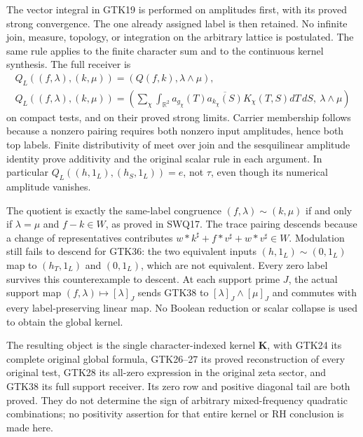 The vector integral in GTK19 is performed on
amplitudes first, with its proved strong
convergence. The one already assigned label
is then retained. No infinite join, measure,
topology, or integration on the arbitrary
lattice is postulated. The same rule applies
to the finite character sum and to the
continuous kernel synthesis. The full receiver is
\begin{equation}\tag{GTK38}
 \begin{gathered}
 Q_L((f,\lambda),(k,\mu))
           =(Q(f,k),\lambda\wedge\mu),\\
 Q_L((f,\lambda),(k,\mu))
 =\left(\sum_\chi\int_{\mathbb R^2}
 a_{g_\chi}(T)\overline{a_{k_\chi}(S)}
                  K_\chi(T,S)dT\,dS,\ \lambda\wedge\mu\right)
 \end{gathered}
\end{equation}
on compact tests, and on their proved strong limits.
Carrier membership follows because a nonzero
pairing requires both nonzero input amplitudes,
hence both top labels. Finite distributivity of
meet over join and the sesquilinear amplitude
identity prove additivity and the original
scalar rule in each argument. In particular
$Q_L((h,1_L),(h_S,1_L))=e$, not $\tau$,
even though its numerical amplitude vanishes.

The quotient is exactly the same-label
congruence $(f,\lambda)\sim(k,\mu)$ if and only
if $\lambda=\mu$ and $f-k\in W$, as proved in
SWQ17. The trace pairing descends because a
change of representatives contributes
$w*k^\sharp+f*v^\sharp+w*v^\sharp\in W$.
Modulation still fails to descend for GTK36:
the two equivalent inputs $(h,1_L)\sim(0,1_L)$
map to $(h_T,1_L)$ and $(0,1_L)$, which are
not equivalent. Every zero label survives
this counterexample to descent. At each
support prime $J$, the actual support map
$(f,\lambda)\mapsto[\lambda]_J$ sends GTK38
to $[\lambda]_J\wedge[\mu]_J$ and commutes
with every label-preserving linear map.
No Boolean reduction or scalar collapse
is used to obtain the global kernel.

The resulting object is the single
character-indexed kernel $\mathbf K$, with
GTK24 its complete original global formula,
GTK26--27 its proved reconstruction of every
original test, GTK28 its all-zero expression
in the original zeta sector, and GTK38 its
full support receiver. Its zero row and
positive diagonal tail are both proved.
They do not determine the sign of arbitrary
mixed-frequency quadratic combinations;
no positivity assertion for that entire
kernel or RH conclusion is made here.
